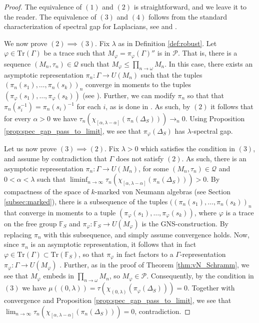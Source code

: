 \documentclass[11pt]{amsart}
\newcommand{\Tr}[1]{\mathrm{Tr}\left(#1\right)}
\newcommand{\ultprod}[1]{\prod_{#1 \to \omega}}
\newcommand{\F}{{\mathbb{F}}}
\newcommand{\cQ}{{\mathcal{Q}}}
\newcommand{\cP}{{\mathcal{P}}}
\theoremstyle{definition}
\theoremstyle{remark}
\theoremstyle{definition}
\begin{document}
\begin{proof}
    The equivalence of $(1)$ and $(2)$ is straightforward, and we leave it to the reader. 
    The equivalence of $(3)$ and $(4)$ follows from the standard characterization of spectral gap for Laplacians, see \cite[Proposition I]{dlHRV} and \cite[Proposition 1.1.9]{BdlV}.
    
    We now prove $(2) \implies (3)$. 
    Fix $\lambda$ as in Definition \ref{def:robust}.
    Let $\varphi \in \Tr{\Gamma}$ be a trace such that $M_\varphi = \pi_\varphi(\Gamma) ''$ is in $\cP$.
    That is, there is a sequence $(M_n,\tau_n) \in \cQ$ such that $M_\varphi \leq \ultprod{n} M_n$.
    In this case, there exists an asymptotic representation $\pi_n: \Gamma \to U(M_n)$ such that the tuples $(\pi_n(s_1), \dots , \pi_n(s_k))_n$ converge in moments to the tuples $(\pi_\varphi(s_1),\dots ,\pi_\varphi(s_k))$ (see \cite[Theorem 7]{OzawaConnes}).
    Further, we can modify $\pi_n$ so that that $\pi_n(s_i^{-1}) = \pi_n(s_i)^{-1}$ for each $i$, as is done in \cite[Section 3.1]{DGLT}.
    As such, by $(2)$ it follows that for every $\alpha> 0$ we have $\tau_n(\chi_{[\alpha,\lambda-\alpha]}(\pi_n(\Delta_S))) \to_n 0$. Using Proposition \ref{prop:spec_gap_pass_to_limit}, we see that $\pi_{\varphi}(\Delta_S)$ has $\lambda$-spectral gap.
    
    Let us now prove $(3) \implies (2)$.
    Fix $\lambda > 0$ which satisfies the condition in $(3)$, and assume by contradiction that $\Gamma$ does not satisfy $(2)$. 
    As such, there is an asymptotic representation $\pi_n: \Gamma \to U(M_n)$, for some $(M_n,\tau_n) \in \cQ$ and $0 < \alpha<\lambda$ such that $\liminf_{n \to \infty} \tau_n(\chi_{[\alpha,\lambda-\alpha]}(\pi_n(\Delta_{S}))) > 0 $.
    By compactness of the space of $k$-marked von Neumann algebras (see Section \ref{subsec:marked}),  there is a subsequence of the tuples $((\pi_n(s_1), \dots , \pi_n(s_k))_n$ that converge in moments to a tuple $(\pi_\varphi({s}_1), \dots, \pi_{\varphi}({s}_k))$, where $\varphi$ is a trace on the free group $\mathbb F_S$ and $\pi_\varphi: \F_S \to U(M_\varphi)$ is the GNS-construction.
    By replacing $\pi_n$ with this subsequence, and simply assume convergence holds.
    Now, since $\pi_n$ is an asymptotic representation,  it follows that in fact $\varphi \in \Tr{\Gamma} \subset \Tr{\F_S}$, so that $\pi_\varphi$ in fact factors to a $\Gamma$-representation $\pi_\varphi: \Gamma \to U(M_\varphi)$ . 
    Further, as in the proof of Theorem \ref{thm:vN_Schramm}, we see that $M_\varphi$ embeds in $\ultprod{n} M_n$, so $M_\varphi \in \cP$.
    Consequently, by the condition in $(3)$ we  have $\mu((0,\lambda)) = \tau(\chi_{(0,\lambda)}(\pi_\varphi(\Delta_S))) = 0$.
    Together with convergence and Proposition \ref{prop:spec_gap_pass_to_limit}, we see that $\lim_{n \to \infty} \tau_n(\chi_{[\alpha,\lambda-\alpha]}(\pi_n(\Delta_{S}))) = 0$, contradiction.
\end{proof}
\end{document}
